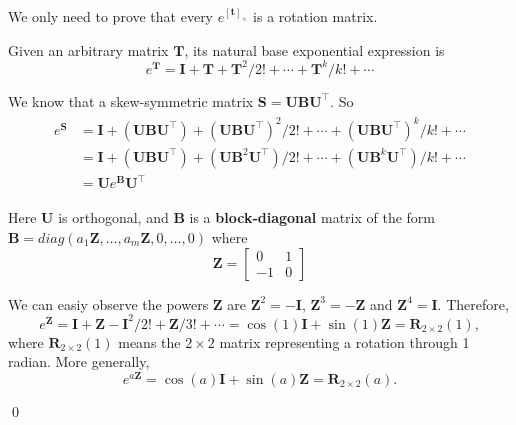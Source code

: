 \documentclass[12pt]{article}
\numberwithin{equation}{section}
\renewenvironment{proof}{{\bfseries Proof.}}{\qed \\}
\begin{document}
\begin{proof} We only need to prove that every $e^{[\mathbf{t}]_{\times}}$ is a rotation matrix.

Given an arbitrary matrix $\mathbf{T}$, its natural base exponential expression is
\begin{equation}
e^\mathbf{T} = \mathbf{I} + \mathbf{T} + \mathbf{T}^2 / 2! + \cdots + \mathbf{T}^k / k! + \cdots
\label{eq:e}
\end{equation}

We know that a skew-symmetric matrix $\mathbf{S} = \mathbf{U}\mathbf{B}\mathbf{U}^\top$. So
\begin{align}
\begin{split}
e^\mathbf{S} &= \mathbf{I} + (\mathbf{U}\mathbf{B}\mathbf{U}^\top) + (\mathbf{U}\mathbf{B}\mathbf{U}^\top)^2/2! + \cdots + (\mathbf{U}\mathbf{B}\mathbf{U}^\top)^k / k! + \cdots \\
&= \mathbf{I} + (\mathbf{U}\mathbf{B}\mathbf{U}^\top) + (\mathbf{U}\mathbf{B}^2\mathbf{U}^\top)/2! + \cdots + (\mathbf{U}\mathbf{B}^k\mathbf{U}^\top)/k! + \cdots \\
&= \mathbf{U}e^{\mathbf{B}}\mathbf{U}^\top
\end{split}
\label{eq:skew:es}
\end{align}

Here $\mathbf{U}$ is orthogonal, and $\mathbf{B}$ is a \textbf{block-diagonal} matrix of the form $\mathbf{B} = diag(a_1\mathbf{Z}, \dots, a_m\mathbf{Z}, 0, \dots, 0)$ where
\begin{equation*}
\mathbf{Z} =
\begin{bmatrix}
0 & 1 \\
-1 & 0
\end{bmatrix}
\end{equation*}

We can easiy observe the powers $\mathbf{Z}$ are $\mathbf{Z}^2 = -\mathbf{I}$, $\mathbf{Z}^3 = -\mathbf{Z}$ and $\mathbf{Z}^4 = \mathbf{I}$. Therefore,
\begin{equation*}
e^\mathbf{Z} = \mathbf{I} + \mathbf{Z} - \mathbf{I}^2 / 2! + \mathbf{Z} / 3! + \cdots = \cos(1)\mathbf{I} + \sin(1)\mathbf{Z} = \mathbf{R}_{2 \times 2}(1),
\end{equation*}
where $\mathbf{R}_{2 \times 2}(1)$ means the $2 \times 2$ matrix representing a rotation through 1 radian. More generally,
\begin{equation*}
e^{a\mathbf{Z}} = \cos(a)\mathbf{I} + \sin(a)\mathbf{Z} = \mathbf{R}_{2 \times 2}(a).
\end{equation*}


\end{proof}
\end{document}
